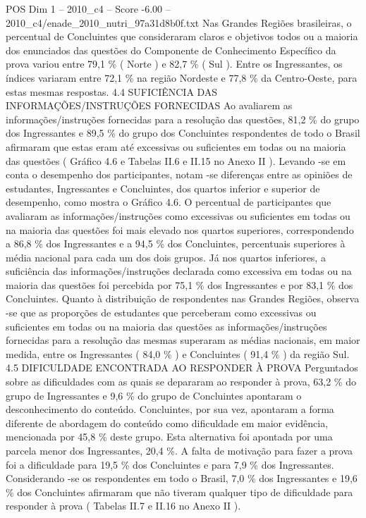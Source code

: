 \begin{textsample}{POS Dim 1 – 2010\_c4 – Score -6.00 – 2010\_c4/enade\_2010\_nutri\_97a31d8b0f.txt}
Nas Grandes Regiões brasileiras, o percentual de Concluintes que consideraram claros e objetivos todos ou a maioria dos enunciados das questões do Componente de Conhecimento Específico da prova variou entre 79,1 \% ( Norte ) e 82,7 \% ( Sul ).
Entre os Ingressantes, os índices variaram entre 72,1 \% na região Nordeste e 77,8 \% da Centro-Oeste, para estas mesmas respostas. 4.4 SUFICIÊNCIA DAS INFORMAÇÕES/INSTRUÇÕES FORNECIDAS Ao avaliarem as informações/instruções fornecidas para a resolução das questões, 81,2 \% do grupo dos Ingressantes e 89,5 \% do grupo dos Concluintes respondentes de todo o Brasil afirmaram que estas eram até excessivas ou suficientes em todas ou na maioria das questões ( Gráfico 4.6 e Tabelas II.6 e II.15 no Anexo II ).
Levando -se em conta o desempenho dos participantes, notam -se diferenças entre as opiniões de estudantes, Ingressantes e Concluintes, dos quartos inferior e superior de desempenho, como mostra o Gráfico 4.6.
O percentual de participantes que avaliaram as informações/instruções como excessivas ou suficientes em todas ou na maioria das questões foi mais elevado nos quartos superiores, correspondendo a 86,8 \% dos Ingressantes e a 94,5 \% dos Concluintes, percentuais superiores à média nacional para cada um dos dois grupos.
Já nos quartos inferiores, a suficiência das informações/instruções declarada como excessiva em todas ou na maioria das questões foi percebida por 75,1 \% dos Ingressantes e por 83,1 \% dos Concluintes.
Quanto à distribuição de respondentes nas Grandes Regiões, observa -se que as proporções de estudantes que perceberam como excessivas ou suficientes em todas ou na maioria das questões as informações/instruções fornecidas para a resolução das mesmas superaram as médias nacionais, em maior medida, entre os Ingressantes ( 84,0 \% ) e Concluintes ( 91,4 \% ) da região Sul. 4.5 DIFICULDADE ENCONTRADA AO RESPONDER À PROVA Perguntados sobre as dificuldades com as quais se depararam ao responder à prova, 63,2 \% do grupo de Ingressantes e 9,6 \% do grupo de Concluintes apontaram o desconhecimento do conteúdo.
Concluintes, por sua vez, apontaram a forma diferente de abordagem do conteúdo como dificuldade em maior evidência, mencionada por 45,8 \% deste grupo.
Esta alternativa foi apontada por uma parcela menor dos Ingressantes, 20,4 \%.
A falta de motivação para fazer a prova foi a dificuldade para 19,5 \% dos Concluintes e para 7,9 \% dos Ingressantes.
Considerando -se os respondentes em todo o Brasil, 7,0 \% dos Ingressantes e 19,6 \% dos Concluintes afirmaram que não tiveram qualquer tipo de dificuldade para responder à prova ( Tabelas II.7 e II.16 no Anexo II ).

\end{textsample}
